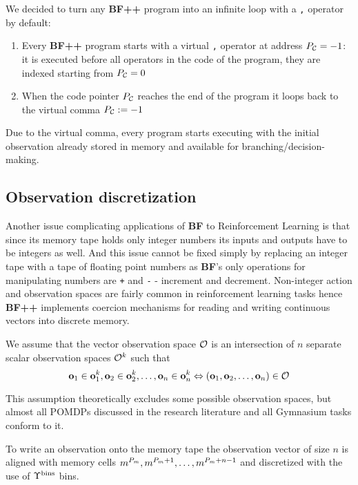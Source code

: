We decided to turn any \textbf{BF++} program into an infinite loop with a \texttt{,} operator by default:
\begin{enumerate}
    \item Every \textbf{BF++} program starts with a virtual \texttt{,} operator at address $P_{\mathcal{C}} = -1$: it is executed before all operators in the code of the program, they are indexed starting from $P_{\mathcal{C}} = 0$
    \item When the code pointer $P_{\mathcal{C}}$ reaches the end of the program it loops back to the virtual comma $P_{\mathcal{C}} := -1$
\end{enumerate}

Due to the virtual comma, every program starts executing with the initial observation already stored in memory and available for branching/decision-making.

\subsection{Observation discretization}
\label{sec:observe}

Another issue complicating applications of \textbf{BF} to Reinforcement Learning is that since its memory tape holds only integer numbers its inputs and outputs have to be integers as well.
And this issue cannot be fixed simply by replacing an integer tape with a tape of floating point numbers as \textbf{BF}'s only operations for manipulating numbers are \texttt{+} and \texttt{-} - increment and decrement.
Non-integer action and observation spaces are fairly common in reinforcement learning tasks hence \textbf{BF++} implements coercion mechanisms for reading and writing continuous vectors into discrete memory.

We assume that the vector observation space $\mathcal{O}$ is an intersection of $n$ separate scalar observation spaces $\mathcal{O}^k$ such that 
\begin{equation}
 \mathbf{o}_1 \in \mathbf{o}_1^k,\mathbf{o}_2 \in \mathbf{o}_2^k,\dots,\mathbf{o}_n \in \mathbf{o}_n^k \Leftrightarrow (\mathbf{o}_1,\mathbf{o}_2,\dots,\mathbf{o}_n) \in \mathcal{O}  
\end{equation}

This assumption theoretically excludes some possible observation spaces, but almost all POMDPs discussed in the research literature and all Gymnasium tasks conform to it.

To write an observation onto the memory tape the observation vector of size $n$ is aligned with memory cells $m^{P_m},m^{P_m+1},\dots,m^{P_m+n-1}$ and discretized with the use of $\Upsilon^\text{bins}$ bins.

